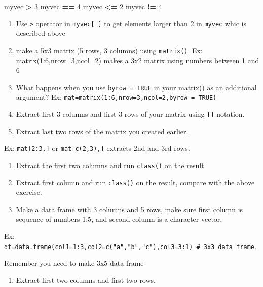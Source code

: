 \documentclass[12pt,]{krantz}
\newenvironment{Shaded}{\begin{snugshade}}{\end{snugshade}}
\newcommand{\DecValTok}[1]{\textcolor[rgb]{0.00,0.00,0.81}{#1}}
\newcommand{\NormalTok}[1]{#1}
\newcommand{\OperatorTok}[1]{\textcolor[rgb]{0.81,0.36,0.00}{\textbf{#1}}}
\newcommand{\StringTok}[1]{\textcolor[rgb]{0.31,0.60,0.02}{#1}}
\providecommand{\tightlist}{%
  \setlength{\itemsep}{0pt}\setlength{\parskip}{0pt}}
\theoremstyle{definition}
\theoremstyle{definition}
\theoremstyle{definition}
\theoremstyle{remark}
\begin{document}
\begin{Shaded}
\begin{Highlighting}[]
\NormalTok{myvec }\OperatorTok{>}\StringTok{ }\DecValTok{3}
\NormalTok{myvec }\OperatorTok{==}\StringTok{ }\DecValTok{4}
\NormalTok{myvec }\OperatorTok{<=}\StringTok{ }\DecValTok{2}
\NormalTok{myvec }\OperatorTok{!=}\StringTok{ }\DecValTok{4}
\end{Highlighting}
\end{Shaded}

\begin{enumerate}
\def\labelenumi{\arabic{enumi}.}
\setcounter{enumi}{18}
\item
  Use \texttt{\textgreater{}} operator in \texttt{myvec{[}\ {]}} to get
  elements larger than 2 in \texttt{myvec} whic is described above
\item
  make a 5x3 matrix (5 rows, 3 columns) using \texttt{matrix()}. Ex:
  matrix(1:6,nrow=3,ncol=2) makes a 3x2 matrix using numbers between 1
  and 6
\item
  What happens when you use \texttt{byrow\ =\ TRUE} in your matrix() as
  an additional argument? Ex:
  \texttt{mat=matrix(1:6,nrow=3,ncol=2,byrow\ =\ TRUE)}
\item
  Extract first 3 columns and first 3 rows of your matrix using
  \texttt{{[}{]}} notation.
\item
  Extract last two rows of the matrix you created earlier.
\end{enumerate}

Ex: \texttt{mat{[}2:3,{]}} or \texttt{mat{[}c(2,3),{]}} extracts 2nd and
3rd rows.

\begin{enumerate}
\def\labelenumi{\arabic{enumi}.}
\setcounter{enumi}{23}
\item
  Extract the first two columns and run \texttt{class()} on the result.
\item
  Extract first column and run \texttt{class()} on the result, compare
  with the above exercise.
\item
  Make a data frame with 3 columns and 5 rows, make sure first column is
  sequence of numbers 1:5, and second column is a character vector.
\end{enumerate}

Ex:
\texttt{df=data.frame(col1=1:3,col2=c("a","b","c"),col3=3:1)\ \#\ 3x3\ data\ frame}.

Remember you need to make 3x5 data frame

\begin{enumerate}
\def\labelenumi{\arabic{enumi}.}
\setcounter{enumi}{26}
\tightlist
\item
  Extract first two columns and first two rows.
\end{enumerate}
\end{document}
